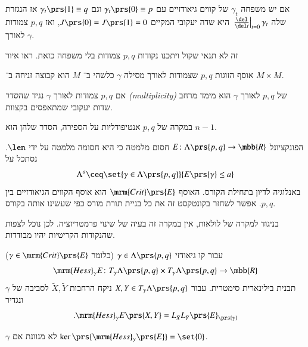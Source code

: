 \documentclass[a4paper,10pt,twoside,openany]{book}
\begin{document}
\begin{remark}
אם יש משפחה
$\gamma_t$
של קווים גיאודזיים עם
$\gamma_t\prs{0} \equiv p$
וגם
$\gamma_t\prs{1} \equiv q$
אז הנגזרת שלה
$\left. \frac{\del}{\del t} \right|_{t=0} \gamma_t$
היא שדה יעקובי המקיים
$J\prs{0} = J\prs{1} = 0$,
ואז
$p,q$
צמודות לאורך
$\gamma$.

זה לא תנאי שקול ויתכנו נקודות
$p,q$
צמודות בלי משפחה כזאת.
ראו איור
\end{remark}

\begin{fact}
אוסף הזוגות
$p,q$
שצמודות לאורך מסילה
$\gamma$
כלשהי ב־%
$M$
הוא קבוצה זניחה ב־%
$M \times M$.
\end{fact}

\begin{definition}
אם
$p,q$
צמודות לאורך
$\gamma$
נגיד
שה\emph{סדר \textenglish{(multiplicity)}}
של
$p,q$
לאורך
$\gamma$
הוא מימד מרחב שדות יעקובי שמתאפסים בקצוות.
\end{definition}

\begin{example}
במקרה של
$p,q$
אנטיפודליות על הספירה, הסדר שלהן הוא
$n-1$.
\end{example}

הפונקציונל
$E \colon \Lambda\prs{p,q} \to \mbb{R}$
חסום מלמטה כי היא חסומה מלמטה על ידי
$\len$.
נסתכל על
\[\Lambda^a \ceq \set{\gamma \in \Lambda\prs{p,q}}{E\prs{\gamma} \leq a}\]
באנלוגיה לדיון בתחילת הקורס.
האוסף
$\mrm{Crit}\prs{E}$
הוא אוסף הקווים הגיאודזיים בין
$p,q$.
אפשר לשחזר בקונטקסט זה את כל בניית תורת מורס כפי שעשינו אותה בקורס.

\begin{remark}
בניגוד למקרה של לולאות, אין במקרה זה בעיה של שינוי פרמטריזציה. לכן נוכל לצפות שהנקודות הקריטיות יהיו מבודדות.
\end{remark}

עבור קו גיאודזי
$\gamma \in \Lambda\prs{p,q}$
(כלומר
$\gamma \in \mrm{Crit}\prs{E}$)
\[\mrm{Hess}_\gamma E \colon T_{\gamma} \Lambda\prs{p,q} \times T_\gamma \Lambda\prs{p,q} \to \mbb{R}\]
תבנית בילינארית סימטרית. עבור
$X,Y \in T_\gamma \Lambda\prs{p,q}$
ניקח הרחבות
$\tilde{X}, \tilde{Y}$
לסביבה של
$\gamma$
ונגדיר
\[\text{.} \mrm{Hess}_\gamma E\prs{X,Y} = L_{\tilde{X}} L_{\tilde{Y}}\prs{E}_{\prs{\gamma}}\]

\begin{definition}
$\gamma$
לא מנוונת אם
$\ker\prs{\mrm{Hess}_\gamma \prs{E}} = \set{0}$.
\end{definition}
\end{document}
